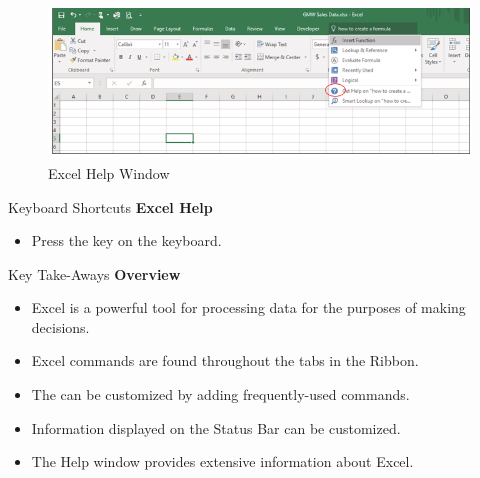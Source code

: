 \begin{figure}[H]
	\centering
	\includegraphics[width=\maxwidth{.95\linewidth}]{gfx/ch01_fig14}
	\caption{Excel Help Window}
	\label{01:fig14}
\end{figure}

\begin{center}
	\begin{shtcutbox}{Keyboard Shortcuts}
		\textbf{Excel Help}
		\\
		\begin{itemize}
			\setlength{\itemsep}{0pt}
			\setlength{\parskip}{0pt}
			\setlength{\parsep}{0pt}
			
			\item Press the  key on the keyboard.
			
		\end{itemize}
	\end{shtcutbox}
\end{center}


\begin{center}
	\begin{tkwbox}{Key Take-Aways}
		\textbf{Overview}
		\\
		\begin{itemize}
			\setlength{\itemsep}{0pt}
			\setlength{\parskip}{0pt}
			\setlength{\parsep}{0pt}
			
			\item Excel is a powerful tool for processing data for the purposes of making decisions.
			\item Excel commands are found throughout the tabs in the Ribbon.
			\item The  can be customized by adding frequently-used commands.
			\item Information displayed on the Status Bar can be customized.
			\item The Help window provides extensive information about Excel.
			
		\end{itemize}
	\end{tkwbox}
\end{center}

